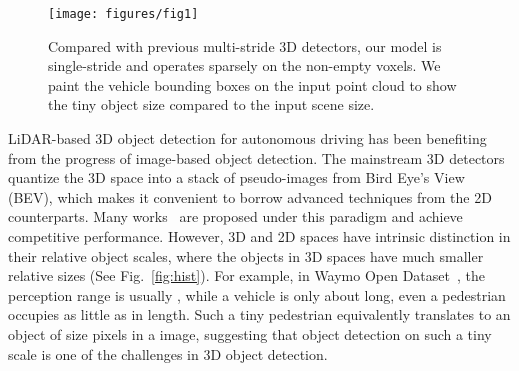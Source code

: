 \begin{figure}[t]
    \vspace{5mm}
    \centering
    \texttt{[image: figures/fig1]}
    \caption{Compared with previous multi-stride 3D detectors, our model is single-stride and operates sparsely on the non-empty voxels. We paint the vehicle bounding boxes on the input point cloud to show the tiny object size compared to the  input scene size.}
    \vspace{-4mm}
    \label{fig:fig1}
\end{figure}

\label{sec:intro}
LiDAR-based 3D object detection for autonomous driving has been benefiting from the progress of image-based object detection. The mainstream 3D detectors quantize the 3D space into a stack of pseudo-images from Bird Eye's View (BEV), which makes it convenient to borrow advanced techniques from the 2D counterparts. Many works~\cite{pointpillar, second, centerpoint, rangedet} are proposed under this paradigm and achieve competitive performance.
However, 3D and 2D spaces have intrinsic distinction in their relative object scales, where the objects in 3D spaces have much smaller relative sizes (See Fig.~\ref{fig:hist}). For example, in Waymo Open Dataset~\cite{wod}, the perception range is usually , while a vehicle is only about  long, even a pedestrian occupies as little as  in length. Such a tiny pedestrian equivalently translates to an object of size  pixels in a  image, suggesting that object detection on such a tiny scale is one of the challenges in 3D object detection. 

